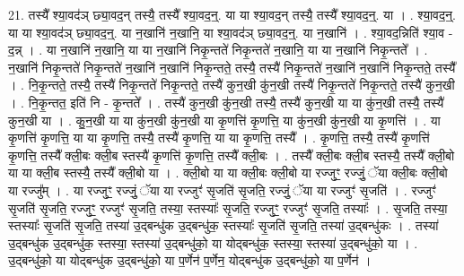 \documentclass[17pt]{extarticle}
\begin{document}
21. तस्यै᳚ श्या॒वद॑ञ् छ्या॒वद॒न् तस्यै॒ तस्यै᳚ श्या॒वद॒न्॒. या या श्या॒वद॒न् तस्यै॒ तस्यै᳚ श्या॒वद॒न्॒. या । . श्या॒वद॒न्॒. या या श्या॒वद॑ञ् छ्या॒वद॒न्॒. या न॒खानि॑ न॒खानि॒ या श्या॒वद॑ञ् छ्या॒वद॒न्॒. या न॒खानि॑ । . श्या॒वद॒न्निति॑ श्या॒व - द॒न्न् । . या न॒खानि॑ न॒खानि॒ या या न॒खानि॑ निकृ॒न्तते॑ निकृ॒न्तते॑ न॒खानि॒ या या न॒खानि॑ निकृ॒न्तते᳚ । . न॒खानि॑ निकृ॒न्तते॑ निकृ॒न्तते॑ न॒खानि॑ न॒खानि॑ निकृ॒न्तते॒ तस्यै॒ तस्यै॑ निकृ॒न्तते॑ न॒खानि॑ न॒खानि॑ निकृ॒न्तते॒ तस्यै᳚ । . नि॒कृ॒न्तते॒ तस्यै॒ तस्यै॑ निकृ॒न्तते॑ निकृ॒न्तते॒ तस्यै॑ कुन॒खी कु॑न॒खी तस्यै॑ निकृ॒न्तते॑ निकृ॒न्तते॒ तस्यै॑ कुन॒खी । . नि॒कृ॒न्तत॒ इति॑ नि - कृ॒न्तते᳚ । . तस्यै॑ कुन॒खी कु॑न॒खी तस्यै॒ तस्यै॑ कुन॒खी या या कु॑न॒खी तस्यै॒ तस्यै॑ कुन॒खी या । . कु॒न॒खी या या कु॑न॒खी कु॑न॒खी या कृ॒णत्ति॑ कृ॒णत्ति॒ या कु॑न॒खी कु॑न॒खी या कृ॒णत्ति॑ । . या कृ॒णत्ति॑ कृ॒णत्ति॒ या या कृ॒णत्ति॒ तस्यै॒ तस्यै॑ कृ॒णत्ति॒ या या कृ॒णत्ति॒ तस्यै᳚ । . कृ॒णत्ति॒ तस्यै॒ तस्यै॑ कृ॒णत्ति॑ कृ॒णत्ति॒ तस्यै᳚ क्ली॒बः क्ली॒ब स्तस्यै॑ कृ॒णत्ति॑ कृ॒णत्ति॒ तस्यै᳚ क्ली॒बः । . तस्यै᳚ क्ली॒बः क्ली॒ब स्तस्यै॒ तस्यै᳚ क्ली॒बो या या क्ली॒ब स्तस्यै॒ तस्यै᳚ क्ली॒बो या । . क्ली॒बो या या क्ली॒बः क्ली॒बो या रज्जुꣳ॒॒ रज्जुं॒ ॅया क्ली॒बः क्ली॒बो या रज्जु᳚म् । . या रज्जुꣳ॒॒ रज्जुं॒ ॅया या रज्जुꣳ॑ सृ॒जति॑ सृ॒जति॒ रज्जुं॒ ॅया या रज्जुꣳ॑ सृ॒जति॑ । . रज्जुꣳ॑ सृ॒जति॑ सृ॒जति॒ रज्जुꣳ॒॒ रज्जुꣳ॑ सृ॒जति॒ तस्या॒ स्तस्याः᳚ सृ॒जति॒ रज्जुꣳ॒॒ रज्जुꣳ॑ सृ॒जति॒ तस्याः᳚ । . सृ॒जति॒ तस्या॒ स्तस्याः᳚ सृ॒जति॑ सृ॒जति॒ तस्या॑ उ॒द्बन्धु॑क उ॒द्बन्धु॑क॒ स्तस्याः᳚ सृ॒जति॑ सृ॒जति॒ तस्या॑ उ॒द्बन्धु॑कः । . तस्या॑ उ॒द्बन्धु॑क उ॒द्बन्धु॑क॒ स्तस्या॒ स्तस्या॑ उ॒द्बन्धु॑को॒ या योद्बन्धु॑क॒ स्तस्या॒ स्तस्या॑ उ॒द्बन्धु॑को॒ या । . उ॒द्बन्धु॑को॒ या योद्बन्धु॑क उ॒द्बन्धु॑को॒ या प॒र्णेन॑ प॒र्णेन॒ योद्बन्धु॑क उ॒द्बन्धु॑को॒ या प॒र्णेन॑ । \newline
\end{document}
